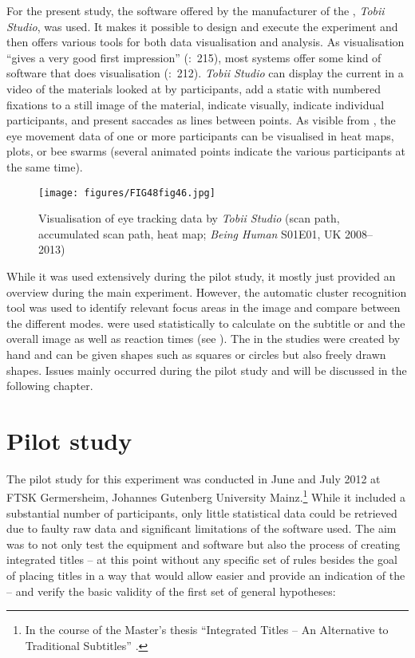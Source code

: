 For the present study, the software offered by the manufacturer of the , \textit{Tobii Studio}, was used. It makes it possible to design and execute the experiment and then offers various tools for both data visualisation and analysis. As visualisation “gives a very good first impression” (\citealt{Hvelplund2014}:~215), most  systems offer some kind of software that does visualisation (\citealt{Hvelplund2014}:~212). \textit{Tobii Studio} can display the current  in a video of the materials looked at by participants, add a static  with numbered fixations to a still image of the material, indicate  visually, indicate individual participants, and present saccades as lines between  points. As visible from , the eye movement data of one or more participants can be visualised in heat maps,  plots, or bee swarms (several animated  points indicate the various participants at the same time).

\begin{figure}
\texttt{[image: figures/FIG48fig46.jpg]}
\caption{Visualisation of eye tracking data by \textit{Tobii Studio} (scan path, accumulated scan path, heat map; \textit{Being Human} S01E01, UK 2008--2013)}
\label{fig:FIG48fig46}
\end{figure}

While it was used extensively during the pilot study, it mostly just provided an overview during the main experiment. However, the automatic cluster recognition tool was used to identify relevant focus areas in the image and compare  between the different modes.  were used statistically to calculate  on the subtitle or  and the overall image as well as reaction times (see ). The  in the studies were created by hand and can be given shapes such as squares or circles but also freely drawn shapes. Issues mainly occurred during the pilot study and will be discussed in the following chapter.

\section{Pilot study}\label{sec:7.3}

The pilot study for this experiment was conducted in June and July 2012 at FTSK Germersheim, Johannes Gutenberg University Mainz.\footnote{In the course of the Master’s thesis “Integrated Titles – An Alternative to Traditional Subtitles” \citep{Fox2012}.} While it included a substantial number of participants, only little statistical data could be retrieved due to faulty raw data and significant limitations of the software used. The aim was to not only test the equipment and software but also the process of creating integrated titles – at this point without any specific set of rules besides the goal of placing titles in a way that would allow easier  and provide an indication of the  – and verify the basic validity of the first set of general hypotheses:


